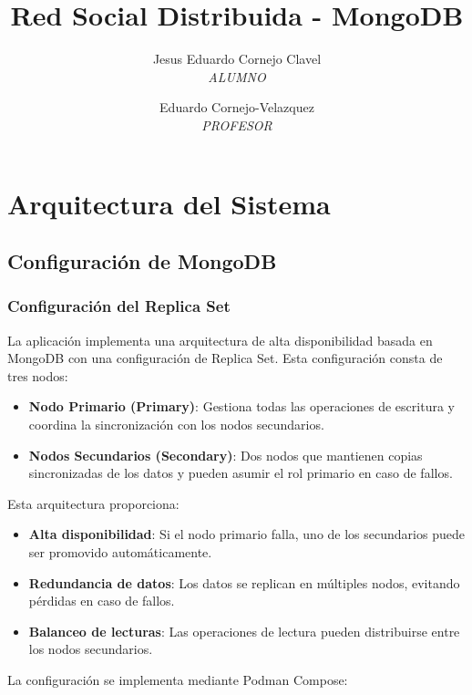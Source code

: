 \documentclass[12pt,letterpaper]{article}
\title{\LARGE \textbf{Red Social Distribuida - MongoDB}}
\author{
    Jesus Eduardo Cornejo Clavel \\
    \textit{ALUMNO} 
    \and
    Eduardo Cornejo-Velazquez \\
    \textit{PROFESOR} 
}
\begin{document}
\maketitle
\tableofcontents
\newpage

\section{Arquitectura del Sistema}
\subsection{Configuración de MongoDB}
\subsubsection{Configuración del Replica Set}
La aplicación implementa una arquitectura de alta disponibilidad basada en MongoDB con una configuración de Replica Set. Esta configuración consta de tres nodos:

\begin{itemize}
    \item \textbf{Nodo Primario (Primary)}: Gestiona todas las operaciones de escritura y coordina la sincronización con los nodos secundarios.
    \item \textbf{Nodos Secundarios (Secondary)}: Dos nodos que mantienen copias sincronizadas de los datos y pueden asumir el rol primario en caso de fallos.
\end{itemize}

Esta arquitectura proporciona:
\begin{itemize}
    \item \textbf{Alta disponibilidad}: Si el nodo primario falla, uno de los secundarios puede ser promovido automáticamente.
    \item \textbf{Redundancia de datos}: Los datos se replican en múltiples nodos, evitando pérdidas en caso de fallos.
    \item \textbf{Balanceo de lecturas}: Las operaciones de lectura pueden distribuirse entre los nodos secundarios.
\end{itemize}

La configuración se implementa mediante Podman Compose:
\end{document}

